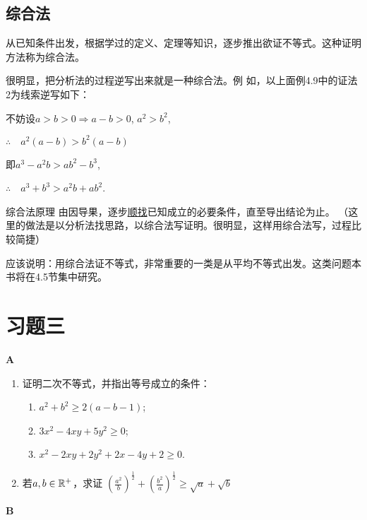 \subsection{综合法}
从已知条件出发，根据学过的定义、定理等知识，逐步推出欲证不等式。这种证明方法称为综合法。

很明显，把分析法的过程逆写出来就是一种综合法。例
如，以上面例4.9中的证法2为线索逆写如下：

不妨设$a>b>0\Longrightarrow a-b>0$, $a^2>b^2$,

$\therefore\quad a^2(a-b)>b^2(a-b)$

即$a^3-a^2b>ab^2-b^3$,

$\therefore\quad a^3+b^3>a^2b+ab^2$.

\begin{thm}{综合法原理 }
    由因导果，逐步\underline{顺找}已知成立的必要条件，直至导出结论为止。
（这里的做法是以分析法找思路，以综合法写证明。很明显，这样用综合法写，过程比较简捷）
\end{thm}

应该说明：用综合法证不等式，非常重要的一类是从平均不等式出发。这类问题本书将在4.5节集中研究。


\section*{习题三}
\begin{center}
    \bfseries A
\end{center}
\begin{enumerate}
    \item 证明二次不等式，并指出等号成立的条件：
\begin{enumerate}[(1)]
\item $a^2+b^2\ge 2(a-b-1)$;
\item $3x^2-4xy+5y^2\ge 0$;
\item $x^2-2xy+2y^2+2x-4y+2\ge 0$.
\end{enumerate}

   \item  若$a,b\in\mathbb{R}^+$，求证
  $\left(\frac{a^2}{b}\right)^{\tfrac{1}{2}}+\left(\frac{b^2}{a}\right)^{\tfrac{1}{2}}\ge \sqrt{a}+\sqrt{b}$
\end{enumerate}

\begin{center}
    \bfseries B
\end{center}

